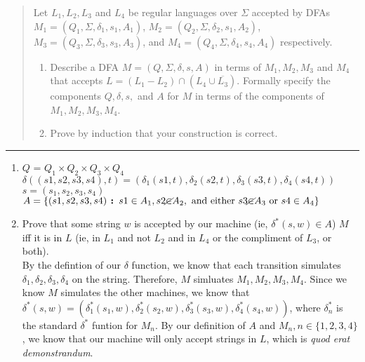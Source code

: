 \documentclass[11pt]{article}
\begin{document}
\begin{quote}
    Let $L_1, L_2,L_3$ and $L_4$ be regular languages over $\Sigma$
  accepted by DFAs $M_1 = (Q_1, \Sigma, \delta_1, s_1, A_1)$,
  $M_2 = (Q_2, \Sigma, \delta_2, s_1, A_2)$, $M_3 = (Q_3,
  \Sigma, \delta_3, s_3, A_3)$, and $M_4 = (Q_4,
  \Sigma, \delta_4, s_4, A_4)$ respectively.

\begin{enumerate}
\item Describe a DFA $M = (Q, \Sigma, \delta, s, A)$ in terms of $M_1,
  M_2,M_3$ and $M_4$ that accepts $L = (L_1 - L_2) \cap (L_4 \cup \overline{L_3})$.  Formally specify the components $Q, \delta, s,$ and $A$
  for $M$ in terms of the components of $M_1, M_2,M_3, M_4$.
\item Prove by induction that your construction is correct.
\end{enumerate}
\end{quote}
\hrule



\begin{solution}
    \begin{enumerate}
        \item $Q$ = $Q_1 \times Q_2 \times Q_3 \times Q_4$ \\
            $\delta((s1,s2,s3,s4),t) = (\delta_1(s1,t),\delta_2(s2,t),\delta_3(s3,t),\delta_4(s4,t))$ \\
            $s = (s_1,s_2,s_3,s_4)$ \\
            $A = \{(s1, s2, s3, s4) \textbf{ : } s1 \in A_1, s2 \cancel{\in} A_2, \text{ and either } s3 \cancel{\in} A_3\text{ or } s4 \in A_4 \}$
        \item Prove that some string $w$ is accepted by our machine (ie, $\delta^*(s, w) \in A$) $M$ iff it is in $L$ (ie, in $L_1$ and not $L_2$ and in $L_4$ or the compliment of $L_3$, or both). \\
            By the defintion of our $\delta$ function, we know that each transition simulates $\delta_1, \delta_2, \delta_3, \delta_4$ on the string. Therefore, $M$ simluates $M_1, M_2, M_3, M_4$. Since we know $M$ simulates the other machines, we know that $\delta^*(s, w) = (\delta^*_1(s_1, w), \delta^*_2(s_2, w), \delta^*_3(s_3, w), \delta^*_4(s_4, w))$, where $\delta^*_n$ is the standard $\delta^*$ funtion for $M_n$. By our definition of $A$ and $M_n, n \in \{1,2,3,4\}$, we know that our machine will only accept strings in $L$, which is \textit{quod erat demonstrandum}.
    \end{enumerate}
\end{solution}
\end{document}
